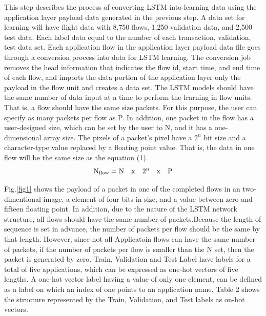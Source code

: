 \documentclass[10pt, twoside, jounal]{IEEEtran}
\begin{document}
This step describes the process of converting LSTM into learning data using the application layer payload data generated in the previous step.
A data set for learning will have flight data with 8,750 flows, 1,250 validation data, and 2,500 test data. Each label data equal to the number of each transaction, validation, test data set.
Each application flow in the application layer payload data file goes through a conversion process into data for LSTM learning.
The conversion job removes the head information that indicates the flow id, start time, and end time of each flow, and imports the data portion of the application layer only the payload in the flow unit and creates a data set. The LSTM models should have the same number of data input at a time to perform the learning in flow units. That is, a flow should have the same size packets. For this purpose, the user can specify as many packets per flow as P. In addition, one packet in the flow has a user-designed size, which can be set by the user to N, and it has a one-dimensional array size. The pixels of a packet's pixel have a $2^n$ bit size and a character-type value replaced by a floating point value.
That is, the data in one flow will be the same size as the equation (1).
\begin{equation}
{\rm N_{flow}} = {\rm N \quad x \quad 2^n \quad  x \quad P} 
\end{equation}

Fig.\ref{fig1} shows the payload of a packet in one of the completed flows in an two-dimentional image, a element of four bits in size, and a value between zero and fifteen floating point. In addition, due to the nature of the LSTM network structure, all flows should have the same number of packets.Because the length of sequence is set in advance, the number of packets per flow should be the same by that length. However, since not all Applicatoin flows can have the same number of packets, if the number of packets per flow is smaller than the N set, then the packet is generated by zero.
Train, Validation and Test Label have labels for a total of five applications, which can be expressed as one-hot vectors of five lengths. A one-hot vector label having a value of only one element, can be defined as a label on which an index of one points to an application name. Table 2 shows the structure represented by the Train, Validation, and Test labels as on-hot vectors.
\end{document}
